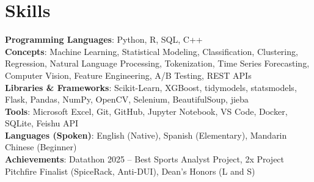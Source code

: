 \documentclass[letterpaper,10pt]{article}
\begin{document}
\section{Skills}
 \begin{itemize}[leftmargin=0.15in, label={}]
    \small{\item{
     \textbf{Programming Languages}{: Python, R, SQL, C++} \\
     \textbf{Concepts}{: Machine Learning, Statistical Modeling, Classification, Clustering, Regression, Natural Language Processing, Tokenization, Time Series Forecasting, Computer Vision, Feature Engineering, A/B Testing, REST APIs} \\
     \textbf{Libraries \& Frameworks}{: Scikit-Learn, XGBoost, tidymodels, statsmodels, Flask, Pandas, NumPy, OpenCV, Selenium, BeautifulSoup, jieba} \\
     \textbf{Tools}{: Microsoft Excel, Git, GitHub, Jupyter Notebook, VS Code, Docker, SQLite, Feishu API} \\
     \textbf{Languages (Spoken)}{: English (Native), Spanish (Elementary), Mandarin Chinese (Beginner)} \\
     \textbf{Achievements}{: Datathon 2025 -- Best Sports Analyst Project, 2x Project Pitchfire Finalist (SpiceRack, Anti-DUI),  Dean's Honors (L and S)}
    }}
 \end{itemize}
 
\end{document}
